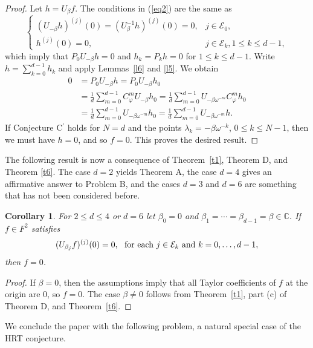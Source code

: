 \documentclass[reqno,11pt]{amsart}
\newtheorem{corollary}[theorem]{Corollary}
\newcommand{\C}{\mathbb C}
\newcommand{\E}{\mathcal E}
\begin{document}
\begin{proof}
Let $h=U_{\beta}f$. The conditions in (\ref{eq2}) are the same as
$$\begin{cases}
(U_{-\beta}h)^{(j)}(0)=(U_{\beta}^{-1}h)^{(j)}(0)=0, &j\in\E_{0},\\[8pt]
h^{(j)}(0)=0,  &j\in\E_k, 1\le k\le d-1,
\end{cases}$$
which imply that $P_{0}U_{-\beta}h = 0$ and $h_{k}=P_{k}h=0$ for
$1\le k \le d-1$. Write $h=\sum_{k=0}^{d-1}h_{k}$ and apply 
Lemmas~\ref{l6} and \ref{l5}. We obtain
\begin{align*}
0&=P_{0}U_{-\beta}h =P_{0}U_{-\beta}h_{0}\\ 
&=\frac{1}{d}\sum_{m=0}^{d-1}C_{\varphi}^{m}U_{-\beta}h_{0}
=\frac{1}{d}\sum_{m=0}^{d-1}U_{-\beta\omega^{-m}}
C_{\varphi}^{m}h_{0}\\
&=\frac{1}{d}\sum_{m=0}^{d-1}U_{-\beta\omega^{-m}}h_{0}
=\frac{1}{d}\sum_{m=0}^{d-1}U_{-\beta\omega^{-m}}h.
\end{align*}
If Conjecture C$^\prime$ holds for $N=d$ and the points $\lambda_k
=-\beta\omega^{-k}$, $0\le k\le N-1$, then we must have $h=0$,
and so $f=0$. This proves the desired result.
\end{proof}

The following result is now a consequence of Theorem~\ref{t1}, 
Theorem D, and Theorem \ref{t6}. The case $d=2$ yields 
Theorem A, the case $d=4$ gives an affirmative answer to 
Problem B, and the cases $d=3$ and $d=6$ are something 
that has not been considered before.

\begin{corollary}\label{c7}
For $2\le d\leq 4$ or $d=6$ let $\beta_{0}=0$ and 
$\beta_1=\cdots=\beta_{d-1}=\beta\in\C$. If $f\in F^2$ satisfies 
\begin{align*}
(U_{\beta_j} f)^{(j)}(0) = 0, ~~\textnormal{for each}~j 
\in \mathcal{E}_{k}~\textnormal{and}~k = 0,\ldots,d-1, 
\end{align*}
then $f=0$.
\end{corollary}

\begin{proof}
If $\beta=0$, then the assumptions imply that all Taylor coefficients of $f$ 
at the origin are $0$, so $f=0$. The case $\beta\neq 0$ follows from
Theorem~\ref{t1}, part (c) of Theorem D, and Theorem~\ref{t6}.  
\end{proof}

We conclude the paper with the following problem, a natural special case
of the HRT conjecture.
\end{document}

